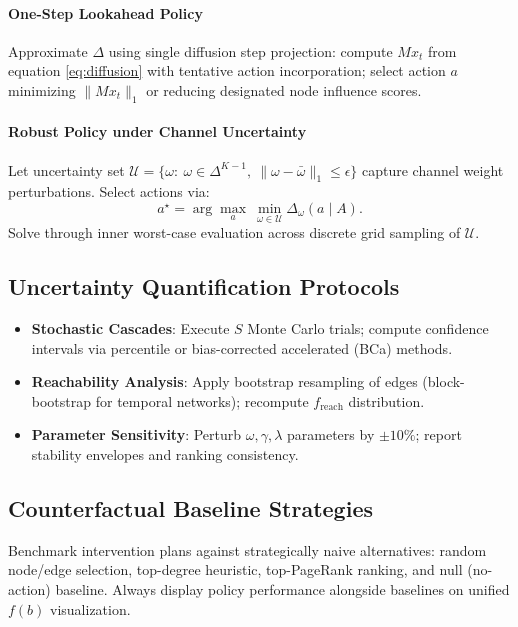 \documentclass[12pt]{article}
\theoremstyle{plain}
\begin{document}
\paragraph{One-Step Lookahead Policy}
Approximate $\Delta$ using single diffusion step projection: compute $Mx_t$ from equation \eqref{eq:diffusion} with tentative action incorporation; select action $a$ minimizing $\|Mx_t\|_1$ or reducing designated node influence scores.

\paragraph{Robust Policy under Channel Uncertainty}
Let uncertainty set $\mathcal{U}=\{\omega:\ \omega\in\Delta^{K-1},\ \|\omega-\bar{\omega}\|_1\le \epsilon\}$ capture channel weight perturbations. Select actions via:
\[
a^\star=\arg\max_{a}\ \min_{\omega\in\mathcal{U}} \Delta_\omega(a\mid A).
\]
Solve through inner worst-case evaluation across discrete grid sampling of $\mathcal{U}$.

\subsection{Uncertainty Quantification Protocols}
\begin{itemize}\itemsep0.2em
\item \textbf{Stochastic Cascades}: Execute $S$ Monte Carlo trials; compute confidence intervals via percentile or bias-corrected accelerated (BCa) methods.
\item \textbf{Reachability Analysis}: Apply bootstrap resampling of edges (block-bootstrap for temporal networks); recompute $f_{\text{reach}}$ distribution.
\item \textbf{Parameter Sensitivity}: Perturb $\omega,\gamma,\lambda$ parameters by $\pm 10\%$; report stability envelopes and ranking consistency.
\end{itemize}

\subsection{Counterfactual Baseline Strategies}
Benchmark intervention plans against strategically naive alternatives: random node/edge selection, top-degree heuristic, top-PageRank ranking, and null (no-action) baseline. Always display policy performance alongside baselines on unified $f(b)$ visualization.
\end{document}
